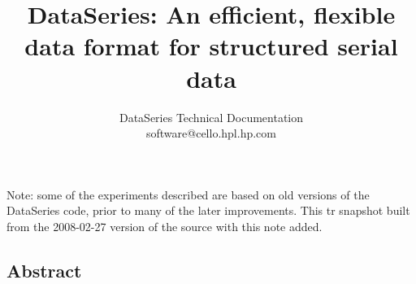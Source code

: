 \documentclass[twocolumn, 10pt]{article}
\begin{document}
\newcommand{\DataSeries}{DataSeries}
\newcommand{\DS}{DS}

\title{\Large \bf \DataSeries{}: An efficient, flexible data format for structured serial data}

\author{
\begin{tabular}{c}
DataSeries Technical Documentation \\
software@cello.hpl.hp.com \\
\end{tabular}
}



\maketitle


{ \Large Note: some of the experiments described are
  based on old versions of the DataSeries code, prior to many of the
  later improvements.  This tr snapshot built from the 2008-02-27
  version of the source with this note added.  }
\subsection*{Abstract}







% 

%

%

\end{document}
